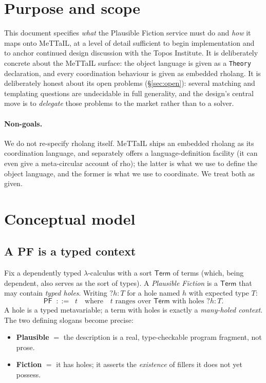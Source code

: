 \documentclass[11pt]{article}
\newcommand{\Term}{\mathsf{Term}}
\newcommand{\Pf}{\mathsf{PF}}
\newcommand{\hole}[2]{\ensuremath{?#1\!:\!#2}}
\newcommand{\tm}{t}
\begin{document}
\tableofcontents
\vspace{1em}

\section{Purpose and scope}
This document specifies \emph{what} the Plausible Fiction service must do and \emph{how} it maps onto
MeTTaIL, at a level of detail sufficient to begin implementation and to anchor continued design
discussion with the Topos Institute. It is deliberately concrete about the MeTTaIL surface: the
object language is given as a \lstinline[language=mettail,basicstyle=\ttfamily\small]|Theory|
declaration, and every coordination behaviour is given as embedded rholang. It is deliberately
honest about its open problems (\S\ref{sec:open}): several matching and templating questions are
undecidable in full generality, and the design's central move is to \emph{delegate} those problems to
the market rather than to a solver.

\paragraph{Non-goals.} We do not re-specify rholang itself. MeTTaIL ships an embedded rholang as its
coordination language, and separately offers a language-definition facility (it can even give a
meta-circular account of rho); the latter is what we use to define the object language, and the
former is what we use to coordinate. We treat both as given.

\section{Conceptual model}\label{sec:model}

\subsection{A PF is a typed context}
Fix a dependently typed $\lambda$-calculus with a sort $\Term$ of terms (which, being dependent, also
serves as the sort of types). A \emph{Plausible Fiction} is a $\Term$ that may contain \emph{typed
holes}. Writing $\hole{h}{T}$ for a hole named $h$ with expected type $T$:
\[
  \Pf \;\;::=\;\; \tm \quad\text{where}\quad \tm \text{ ranges over } \Term \text{ with holes } \hole{h}{T}.
\]
A hole is a typed metavariable; a term with holes is exactly a \emph{many-holed context}. The two
defining slogans become precise:
\begin{itemize}[leftmargin=1.4em,itemsep=2pt]
  \item \textbf{Plausible} $=$ the description is a real, type-checkable program fragment, not prose.
  \item \textbf{Fiction} $=$ it has holes; it asserts the \emph{existence} of fillers it does not yet possess.
\end{itemize}
\end{document}
